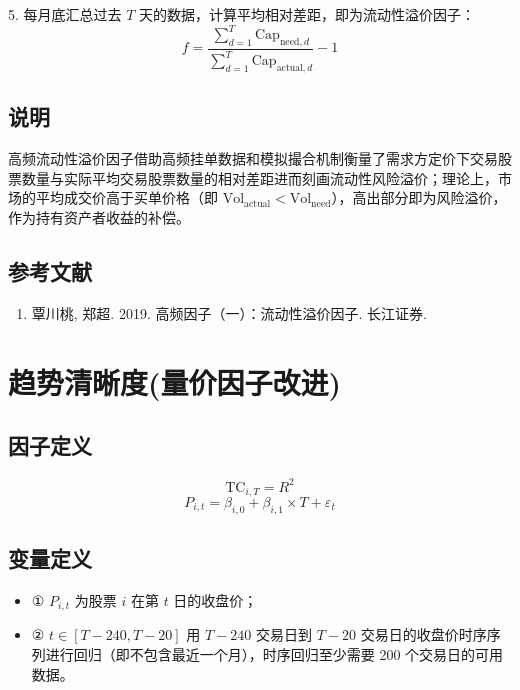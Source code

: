\documentclass{article}
\begin{document}
5. 每月底汇总过去 \( T \) 天的数据，计算平均相对差距，即为流动性溢价因子：
\begin{equation}
    f = \frac{\sum_{d=1}^{T} \mathrm{Cap}_{\mathrm{need},d}}{\sum_{d=1}^{T} \mathrm{Cap}_{\mathrm{actual},d}} - 1
\end{equation}

\subsection{说明}
高频流动性溢价因子借助高频挂单数据和模拟撮合机制衡量了需求方定价下交易股票数量与实际平均交易股票数量的相对差距进而刻画流动性风险溢价；理论上，市场的平均成交价高于买单价格（即 \( \mathrm{Vol}_{\mathrm{actual}} < \mathrm{Vol}_{\mathrm{need}} \)），高出部分即为风险溢价，作为持有资产者收益的补偿。

\subsection{参考文献}
\begin{enumerate}
    \item 覃川桃, 郑超. 2019. 高频因子（一）：流动性溢价因子. 长江证券.
\end{enumerate}

\section{趋势清晰度(量价因子改进)}

\subsection{因子定义}
\begin{equation}
    \mathrm{TC}_{i,T} = R^2
\end{equation}
\begin{equation}
    P_{i,t} = \beta_{i,0} + \beta_{i,1} \times T + \varepsilon_t
\end{equation}

\subsection{变量定义}
\begin{itemize}
    \item ① \( P_{i,t} \) 为股票 \( i \) 在第 \( t \) 日的收盘价；
    \item ② \( t \in [T-240, T-20] \) 用 \( T-240 \) 交易日到 \( T-20 \) 交易日的收盘价时序序列进行回归（即不包含最近一个月），时序回归至少需要 200 个交易日的可用数据。
\end{itemize}
\end{document}
